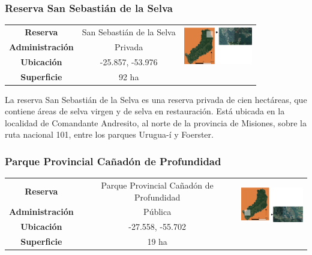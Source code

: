 \subsubsection{Reserva San Sebastián de la Selva}
\begin{table}[H]
\centering
\begin{tabular}{|c|c|c|}
\hline
 \textbf{Reserva} & San Sebastián de la Selva &   \multirow{ 3}{*}{\includegraphics[width=30mm]{Imagenes/San Sebastian.png}}\\ 
\textbf{Administración} & Privada\\
        
        \textbf{Ubicación} & -25.857, -53.976 \\
         
        \textbf{Superficie} & 92 ha\\
\hline        
\end{tabular}

\label{Profundidad}
\end{table}
La reserva San Sebastián de la Selva es una reserva privada de cien hectáreas, que contiene áreas de selva virgen y de selva en restauración. Está ubicada en la localidad de Comandante Andresito, al norte de la provincia de Misiones, sobre la ruta nacional 101, entre los parques Urugua-í y Foerster. 
\subsubsection{Parque Provincial Cañadón de Profundidad}
\begin{table}[H]
\centering
\begin{tabular}{|c|c|c|}
\hline
 \textbf{Reserva} & Parque Provincial Cañadón de Profundidad &   \multirow{ 3}{*}{\includegraphics[width=30mm]{Imagenes/Profundidad.png}}\\ 
\textbf{Administración} & Pública\\
        
        \textbf{Ubicación} & -27.558, -55.702 \\
         
        \textbf{Superficie} & 19 ha\\
\hline        
\end{tabular}

\label{Profundidad}
\end{table}
